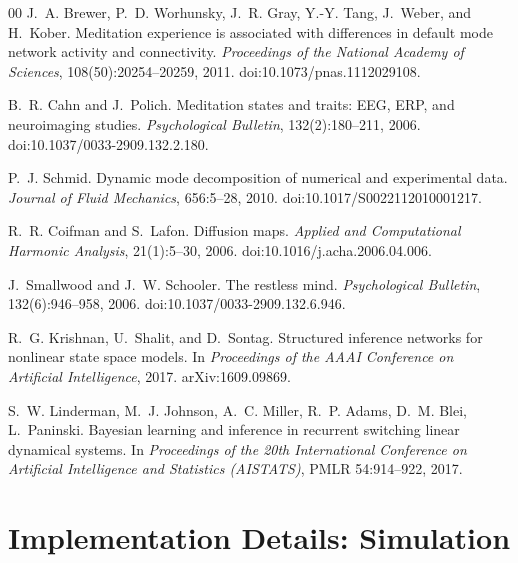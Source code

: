 \documentclass[5p,twocolumn,authoryear]{elsarticle}
\begin{document}
\begin{thebibliography}{00}
J.~A. Brewer, P.~D. Worhunsky, J.~R. Gray, Y.-Y. Tang, J.~Weber, and H.~Kober.
\newblock Meditation experience is associated with differences in default mode network activity and connectivity.
\newblock \emph{Proceedings of the National Academy of Sciences}, 108(50):20254--20259, 2011.
\newblock doi:10.1073/pnas.1112029108.

B.~R. Cahn and J.~Polich.
\newblock Meditation states and traits: EEG, ERP, and neuroimaging studies.
\newblock \emph{Psychological Bulletin}, 132(2):180--211, 2006.
\newblock doi:10.1037/0033-2909.132.2.180.

P.~J. Schmid.
\newblock Dynamic mode decomposition of numerical and experimental data.
\newblock \emph{Journal of Fluid Mechanics}, 656:5--28, 2010.
\newblock doi:10.1017/S0022112010001217.

R.~R. Coifman and S.~Lafon.
\newblock Diffusion maps.
\newblock \emph{Applied and Computational Harmonic Analysis}, 21(1):5--30, 2006.
\newblock doi:10.1016/j.acha.2006.04.006.

J.~Smallwood and J.~W. Schooler.
\newblock The restless mind.
\newblock \emph{Psychological Bulletin}, 132(6):946--958, 2006.
\newblock doi:10.1037/0033-2909.132.6.946.

R.~G. Krishnan, U.~Shalit, and D.~Sontag.
\newblock Structured inference networks for nonlinear state space models.
\newblock In \emph{Proceedings of the AAAI Conference on Artificial Intelligence}, 2017.
\newblock arXiv:1609.09869.

S.~W. Linderman, M.~J. Johnson, A.~C. Miller, R.~P. Adams, D.~M. Blei, L.~Paninski.
\newblock Bayesian learning and inference in recurrent switching linear dynamical systems.
\newblock In \emph{Proceedings of the 20th International Conference on Artificial Intelligence and Statistics (AISTATS)}, PMLR 54:914--922, 2017.


\section{Implementation Details: Simulation}


\end{thebibliography}
\end{document}
